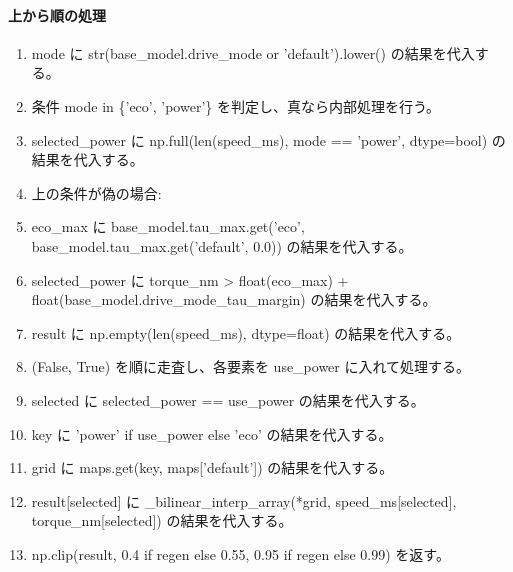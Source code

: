 \documentclass[a4paper,11pt]{article}
\begin{document}
            \paragraph{上から順の処理}
            \begin{enumerate}[leftmargin=1.8em]
            \item mode に str(base\_model.drive\_mode or 'default').lower() の結果を代入する。
\item 条件 mode in \{'eco', 'power'\} を判定し、真なら内部処理を行う。
\item   selected\_power に np.full(len(speed\_ms), mode == 'power', dtype=bool) の結果を代入する。
\item   上の条件が偽の場合:
\item   eco\_max に base\_model.tau\_max.get('eco', base\_model.tau\_max.get('default', 0.0)) の結果を代入する。
\item   selected\_power に torque\_nm > float(eco\_max) + float(base\_model.drive\_mode\_tau\_margin) の結果を代入する。
\item result に np.empty(len(speed\_ms), dtype=float) の結果を代入する。
\item (False, True) を順に走査し、各要素を use\_power に入れて処理する。
\item   selected に selected\_power == use\_power の結果を代入する。
\item   key に 'power' if use\_power else 'eco' の結果を代入する。
\item   grid に maps.get(key, maps['default']) の結果を代入する。
\item   result[selected] に \_bilinear\_interp\_array(*grid, speed\_ms[selected], torque\_nm[selected]) の結果を代入する。
\item np.clip(result, 0.4 if regen else 0.55, 0.95 if regen else 0.99) を返す。
            \end{enumerate}
\end{document}
